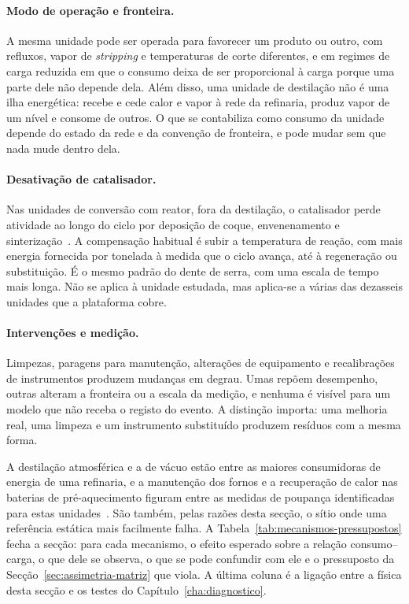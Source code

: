 \paragraph{Modo de operação e fronteira.} A mesma unidade pode ser operada para
favorecer um produto ou outro, com refluxos, vapor de \emph{stripping} e
temperaturas de corte diferentes, e em regimes de carga reduzida em que o
consumo deixa de ser proporcional à carga porque uma parte dele não depende
dela. Além disso, uma unidade de destilação não é uma ilha energética: recebe
e cede calor e vapor à rede da refinaria, produz vapor de um nível e consome
de outros. O que se contabiliza como consumo da unidade depende do estado da
rede e da convenção de fronteira, e pode mudar sem que nada mude dentro dela.

\paragraph{Desativação de catalisador.} Nas unidades de conversão com reator,
fora da destilação, o catalisador perde atividade ao longo do ciclo por
deposição de coque, envenenamento e sinterização~\cite{Bartholomew2001}. A
compensação habitual é subir a temperatura de reação, com mais energia
fornecida por tonelada à medida que o ciclo avança, até à regeneração ou
substituição. É o mesmo padrão do dente de serra, com uma escala de tempo mais
longa. Não se aplica à unidade estudada, mas aplica-se a várias das
dezasseis unidades que a plataforma cobre.

\paragraph{Intervenções e medição.} Limpezas, paragens para manutenção,
alterações de equipamento e recalibrações de instrumentos produzem mudanças
em degrau. Umas repõem desempenho, outras alteram a fronteira ou a escala da
medição, e nenhuma é visível para um modelo que não receba o registo do
evento. A distinção importa: uma melhoria real, uma limpeza e um instrumento
substituído produzem resíduos com a mesma forma.

A destilação atmosférica e a de vácuo estão entre as maiores consumidoras de
energia de uma refinaria, e a manutenção dos fornos e a recuperação de calor
nas baterias de pré-aquecimento figuram entre as medidas de poupança
identificadas para estas unidades~\cite{WorrellGalitsky2005}. São também,
pelas razões desta secção, o sítio onde uma referência estática mais
facilmente falha. A Tabela~\ref{tab:mecanismos-pressupostos} fecha a secção: para cada
mecanismo, o efeito esperado sobre a relação consumo--carga, o que dele se
observa, o que se pode confundir com ele e o pressuposto da
Secção~\ref{sec:assimetria-matriz} que viola. A última coluna é a ligação
entre a física desta secção e os testes do Capítulo~\ref{cha:diagnostico}.

